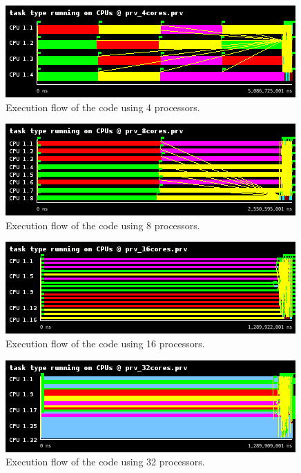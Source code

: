 \documentclass[12pt, a4paper]{article}
\begin{document}
\begin{figure}[H]
	\centering
	\includegraphics[scale=0.75]{./images/S1_scalability/S1_scalability_4}
	
	\label{fig_ann:S1_scalability_4}
	\caption{Execution flow of the code using 4 processors.}
\end{figure}





\begin{figure}[H]
	\centering
	\includegraphics[scale=0.75]{./images/S1_scalability/S1_scalability_8}
	
	\label{fig_ann:S1_scalability_8}
	\caption{Execution flow of the code using 8 processors.}
\end{figure}





\begin{figure}[H]
	\centering
	\includegraphics[scale=0.75]{./images/S1_scalability/S1_scalability_16}
	
	\label{fig_ann:S1_scalability_16}
	\caption{Execution flow of the code using 16 processors.}
\end{figure}





\begin{figure}[H]
	\centering
	\includegraphics[scale=0.75]{./images/S1_scalability/S1_scalability_32}
	
	\label{fig_ann:S1_scalability_32}
	\caption{Execution flow of the code using 32 processors.}
\end{figure}
\end{document}
